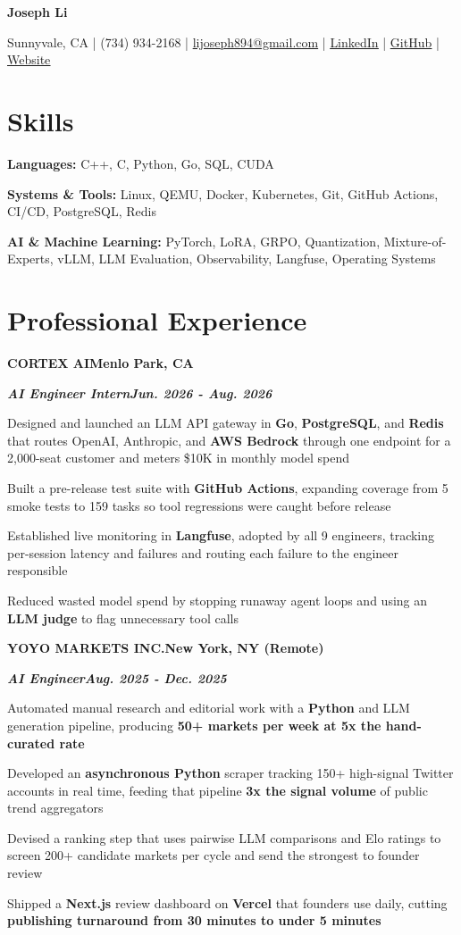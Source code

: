 \documentclass[10pt]{article}
\renewcommand{\resumeheader}[2]{%
  {\centering\fontsize{16}{18}\selectfont\bfseries #1\par}%
  \vspace{4pt}%
  {\centering\fontsize{10.5}{13}\selectfont #2\par}%
  \vspace{6pt}%
}
\renewcommand{\skill}[2]{\textbf{#1:} #2\par\vspace{1.5pt}}
\newcommand{\job}[4]{%
  \vspace{0pt}%
  \textbf{\MakeUppercase{#1}}\hfill\textbf{#2}\par
  \vspace{0.5pt}%
  \textbf{\textit{#3}}\hfill\textbf{\textit{#4}}\par
}
\begin{document}
\resumeheader{Joseph Li}{%
Sunnyvale, CA | (734) 934-2168 | \href{mailto:lijoseph894@gmail.com}{lijoseph894@gmail.com} | \href{https://www.linkedin.com/in/lijoseph894/}{\underline{LinkedIn}} | \href{https://github.com/josephl894}{\underline{GitHub}} | \href{https://josephl894.github.io}{\underline{Website}}}

\section{Skills}
\skill{Languages}{C++, C, Python, Go, SQL, CUDA}
\skill{Systems \& Tools}{Linux, QEMU, Docker, Kubernetes, Git, GitHub Actions, CI/CD, PostgreSQL, Redis}
\skill{AI \& Machine Learning}{PyTorch, LoRA, GRPO, Quantization, Mixture-of-Experts, vLLM, LLM Evaluation, Observability, Langfuse, Operating Systems}

\section{Professional Experience}
\job{Cortex AI}{Menlo Park, CA}{AI Engineer Intern}{Jun. 2026 - Aug. 2026}
\begin{bullets}
  \item Designed and launched an LLM API gateway in \textbf{Go}, \textbf{PostgreSQL}, and \textbf{Redis} that routes OpenAI, Anthropic, and \textbf{AWS Bedrock} through one endpoint for a 2,000-seat customer and meters \$10K in monthly model spend
  \item Built a pre-release test suite with \textbf{GitHub Actions}, expanding coverage from 5 smoke tests to 159 tasks so tool regressions were caught before release
  \item Established live monitoring in \textbf{Langfuse}, adopted by all 9 engineers, tracking per-session latency and failures and routing each failure to the engineer responsible
  \item Reduced wasted model spend by stopping runaway agent loops and using an \textbf{LLM judge} to flag unnecessary tool calls
\end{bullets}

\vspace{3pt}
\job{Yoyo Markets Inc.}{New York, NY (Remote)}{AI Engineer}{Aug. 2025 - Dec. 2025}
\begin{bullets}
  \item Automated manual research and editorial work with a \textbf{Python} and LLM generation pipeline, producing \textbf{50+ markets per week at 5x the hand-curated rate}
  \item Developed an \textbf{asynchronous Python} scraper tracking 150+ high-signal Twitter accounts in real time, feeding that pipeline \textbf{3x the signal volume} of public trend aggregators
  \item Devised a ranking step that uses pairwise LLM comparisons and Elo ratings to screen 200+ candidate markets per cycle and send the strongest to founder review
  \item Shipped a \textbf{Next.js} review dashboard on \textbf{Vercel} that founders use daily, cutting \textbf{publishing turnaround from 30 minutes to under 5 minutes}
\end{bullets}
\end{document}
